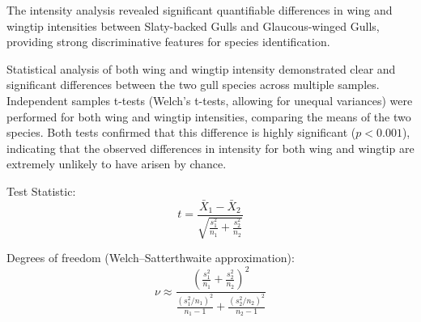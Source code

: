 \documentclass[a4paper,12pt]{report}
\begin{document}
The intensity analysis revealed significant quantifiable differences in wing and wingtip intensities between Slaty-backed Gulls and Glaucous-winged Gulls, providing strong discriminative features for species identification.

Statistical analysis of both wing and wingtip intensity demonstrated clear and significant differences between the two gull species across multiple samples. Independent samples t-tests (Welch's t-tests, allowing for unequal variances) were performed for both wing and wingtip intensities, comparing the means of the two species. Both tests  confirmed that this difference is highly significant ($p < 0.001$), indicating that the observed differences in intensity for both wing and wingtip are extremely unlikely to have arisen by chance.

\begin{table}[H]
    \centering
    \caption{Wing and Wingtip Intensity Statistical Summary}
    \label{tab:intensity-stats-combined}
\end{table}

Test Statistic:
\begin{equation}
t = \frac{\bar{X}_1 - \bar{X}_2}{\sqrt{\frac{s_1^2}{n_1} + \frac{s_2^2}{n_2}}}
\end{equation}

Degrees of freedom (Welch--Satterthwaite approximation):
\begin{equation}
\nu \approx \frac{\left(\frac{s_1^2}{n_1} + \frac{s_2^2}{n_2}\right)^2}{\frac{(s_1^2/n_1)^2}{n_1-1} + \frac{(s_2^2/n_2)^2}{n_2-1}}
\end{equation}
\end{document}
